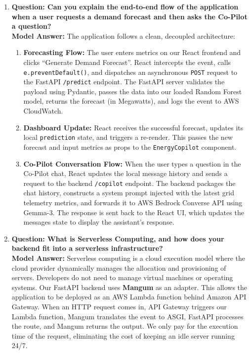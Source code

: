 \documentclass[11pt,a4paper]{article}
\begin{document}
\begin{enumerate}[leftmargin=*]
    \item \textbf{Question: Can you explain the end-to-end flow of the application when a user requests a demand forecast and then asks the Co-Pilot a question?}
    \\ \textbf{Model Answer:} The application follows a clean, decoupled architecture:
    \begin{enumerate}
        \item \textbf{Forecasting Flow:} The user enters metrics on our React frontend and clicks ``Generate Demand Forecast''. React intercepts the event, calls \texttt{e.preventDefault()}, and dispatches an asynchronous \texttt{POST} request to the FastAPI \texttt{/predict} endpoint. The FastAPI server validates the payload using Pydantic, passes the data into our loaded Random Forest model, returns the forecast (in Megawatts), and logs the event to AWS CloudWatch.
        \item \textbf{Dashboard Update:} React receives the successful forecast, updates its local \texttt{prediction} state, and triggers a re-render. This passes the new forecast and input metrics as props to the \texttt{EnergyCopilot} component.
        \item \textbf{Co-Pilot Conversation Flow:} When the user types a question in the Co-Pilot chat, React updates the local message history and sends a request to the backend \texttt{/copilot} endpoint. The backend packages the chat history, constructs a system prompt injected with the latest grid telemetry metrics, and forwards it to AWS Bedrock Converse API using Gemma-3. The response is sent back to the React UI, which updates the messages state to display the assistant's response.
    \end{enumerate}

    \item \textbf{Question: What is Serverless Computing, and how does your backend fit into a serverless infrastructure?}
    \\ \textbf{Model Answer:} Serverless computing is a cloud execution model where the cloud provider dynamically manages the allocation and provisioning of servers. Developers do not need to manage virtual machines or operating systems. 
    Our FastAPI backend uses \textbf{Mangum} as an adapter. This allows the application to be deployed as an AWS Lambda function behind Amazon API Gateway. When an HTTP request comes in, API Gateway triggers our Lambda function, Mangum translates the event to ASGI, FastAPI processes the route, and Mangum returns the output. We only pay for the execution time of the request, eliminating the cost of keeping an idle server running 24/7.
\end{enumerate}
\end{document}
